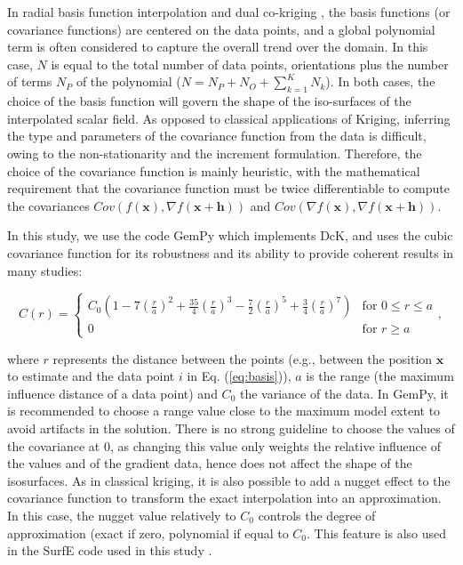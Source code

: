 \documentclass[preprint]{ring20}
\newcommand{\bx}{\mathbf{x}}
\begin{document}
In radial basis function interpolation \citep[RBF, ][]{Carr2001,Cowan2002ASGMEM,Hillier2014MG} and dual co-kriging \citep{Lajaunie1997MG,Chiles04OMSMP,Calcagno2008PEPI,delaVarga2018GMDD,Pizzella2022MG}, the basis functions (or covariance functions) are centered on the data points, and a global polynomial term is often considered to capture the overall trend over the domain. In this case, $N$ is equal to the total number of data points, orientations plus the number of terms $N_P$ of the polynomial ($N = N_P + N_O + \sum_{k=1}^{K}{N_k}$). In both cases, the choice of the basis function will govern the shape of the iso-surfaces of the interpolated scalar field. As opposed to classical applications of Kriging, inferring the type and parameters of the covariance function from the data is difficult, owing to the non-stationarity and the increment formulation. Therefore, the choice of the covariance function is mainly heuristic, with the mathematical requirement that the covariance function must be twice differentiable to compute the covariances $Cov\left(f(\bx), \nabla {f}(\bx+\mathbf{h})\right)$ and $Cov\left(\nabla f(\bx), \nabla f(\bx+\mathbf{h})\right)$. 

In this study, we use the code GemPy \cite{delaVarga2018GMDD} which implements DcK, and uses the cubic covariance function for its  robustness and its ability to provide coherent results in many studies: 

\begin{equation}
C(r) = \begin{cases}
C_0(1-7(\frac{r}{a})^2+ \frac{35}{4}(\frac{r}{a})^3
- \frac{7}{2}(\frac{r}{a})^5 +\frac{3}{4}(\frac{r}{a})^7) &
\text{for } 0  \leq r \leq a \\
0 & \text{for } r  \geq a
\end{cases},
\end{equation}

\noindent where $r$ represents the distance between the points (e.g., between the position $\bx$ to estimate and the data point $i$ in Eq. (\ref{eq:basis})), $a$ is the range (the maximum influence distance of a data point) 
and $C_0$ the variance of the data. In GemPy, it is recommended to choose a range value close to the
maximum model extent to avoid artifacts in the solution. There is no strong guideline 
to choose the values of the covariance at 0, as changing this value only weights the relative influence of the values and of the gradient data, hence does not affect the shape of the isosurfaces. 
As in classical kriging, it is also possible to add a nugget effect to the covariance function to transform the exact interpolation into an approximation. In this case, the nugget value relatively to $C_0$ controls the degree of approximation (exact if zero, polynomial if equal to $C_0$. This feature is also used in the SurfE code used in this study \citep{Hillier2014MG}. %
\end{document}
